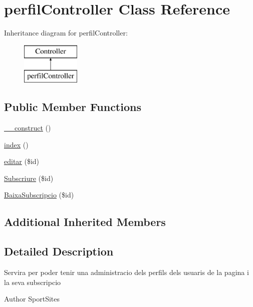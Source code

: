\hypertarget{classperfil_controller}{}\section{perfil\+Controller Class Reference}
\label{classperfil_controller}
Inheritance diagram for perfil\+Controller\+:\begin{figure}[H]
\begin{center}
\leavevmode
\includegraphics[height=2.000000cm]{classperfil_controller}
\end{center}
\end{figure}
\subsection*{Public Member Functions}
\begin{DoxyCompactItemize}
\item 
\hyperlink{classperfil_controller_a095c5d389db211932136b53f25f39685}{\+\_\+\+\_\+construct} ()
\item 
\hyperlink{classperfil_controller_a149eb92716c1084a935e04a8d95f7347}{index} ()
\item 
\hyperlink{classperfil_controller_a399b37729bdaca122345a17794f0fcb7}{editar} (\$id)
\item 
\hyperlink{classperfil_controller_ad941c7c52c91f12c733492c26e0ea9a9}{Subscriure} (\$id)
\item 
\hyperlink{classperfil_controller_a5a9349a32a49732594e7cd1d11aea670}{Baixa\+Subscripcio} (\$id)
\end{DoxyCompactItemize}
\subsection*{Additional Inherited Members}


\subsection{Detailed Description}
Servira per poder tenir una administracio dels perfils dels usuaris de la pagina i la seva subscripcio

\begin{DoxyAuthor}{Author}
Sport\+Sites 
\end{DoxyAuthor}

